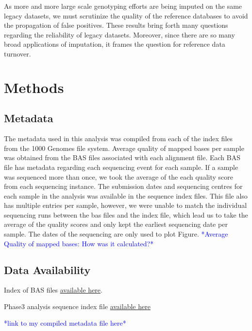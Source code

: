\documentclass[9pt,lineno]{elife}
\newcommand{\todo}[1]{\textcolor{blue}{*#1*}}
\begin{document}
As more and more large scale genotyping efforts are being imputed on the same legacy datasets, we must scrutinize the quality of the reference databases to avoid the propagation of false positives. 
These results bring forth many questions regarding the reliability of legacy datasets. 
Moreover, since there are so many broad applications of imputation, it frames the question for reference data turnover. 



\section{Methods}
\subsection{Metadata}
The metadata used in this analysis was compiled from each of the index files from the 1000 Genomes file system. 
Average quality of mapped bases per sample was obtained from the BAS files associated with each alignment file. 
Each BAS file has metadata regarding each sequencing event for each sample. 
If a sample was sequenced more than once, we took the average of the each quality score from each sequencing instance. 
The submission dates and sequencing centres for each sample in the analysis was available in the sequence index files.  
This file also has multiple entries per sample, however, we were unable to match the individual sequencing runs between the bas files and the index file, which lead us to take the average of the quality scores and only kept the earliest sequencing date per sample. 
The dates of the sequencing are only used to plot Figure. \todo{Average Quality of mapped bases: How was it calculated?}

\subsection{Data Availability}

Index of BAS files \href{http://ftp.1000genomes.ebi.ac.uk/vol1/ftp/data_collections/1000_genomes_project/1000genomes.low_coverage.GRCh38DH.alignment.index}{available here}.

Phase3 analysis sequence index file  \href{http://ftp.1000genomes.ebi.ac.uk/vol1/ftp/phase3/20130502.phase3.analysis.sequence.index}{available here} 

\todo{link to my compiled metadata file here}
\end{document}
